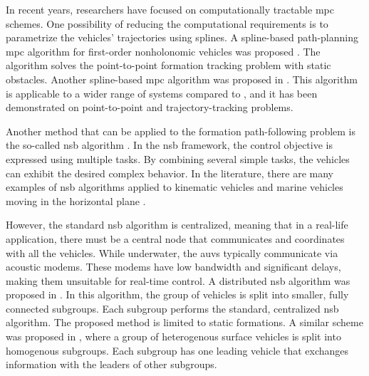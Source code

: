 In recent years, researchers have focused on computationally tractable \gls{mpc} schemes.
One possibility of reducing the computational requirements is to parametrize the vehicles' trajectories using splines.
A spline-based path-planning \gls{mpc} algorithm for first-order nonholonomic vehicles was proposed \cite{saska_2016_predictive}.
The algorithm solves the point-to-point formation tracking problem with static obstacles.
Another spline-based \gls{mpc} algorithm was proposed in \cite{van_parys_2017_DMPC}.
This algorithm is applicable to a wider range of systems compared to \cite{saska_2016_predictive}, and it has been demonstrated on point-to-point and trajectory-tracking problems.

Another method that can be applied to the formation path-following problem is the so-called \gls{nsb} algorithm \cite{antonelli_experiments_2009,arrichiello_formation_2006,pang_2019_formation,eek_formation_2021}.
In the \gls{nsb} framework, the control objective is expressed using multiple tasks.
By combining several simple tasks, the vehicles can exhibit the desired complex behavior.
In the literature, there are many examples of \gls{nsb} algorithms applied to kinematic vehicles \cite{antonelli_experiments_2009} and marine vehicles moving in the 
horizontal plane \cite{arrichiello_formation_2006,pang_2019_formation,eek_formation_2021}.

However, the standard \gls{nsb} algorithm is centralized, meaning that in a real-life application, there must be a central node that communicates and coordinates with all the vehicles.
While underwater, the \glspl{auv} typically communicate via acoustic modems.
These modems have low bandwidth and significant delays, making them unsuitable for real-time control.
A distributed \gls{nsb} algorithm was proposed in \cite{ahmad_multirobot_2014}.
In this algorithm, the group of vehicles is split into smaller, fully connected subgroups.
Each subgroup performs the standard, centralized \gls{nsb} algorithm.
The proposed method is limited to static formations.
A similar scheme was proposed in \cite{tan_coordinated_2022}, where a group of heterogenous surface vehicles is split into homogenous subgroups.
Each subgroup has one leading vehicle that exchanges information with the leaders of other subgroups.

